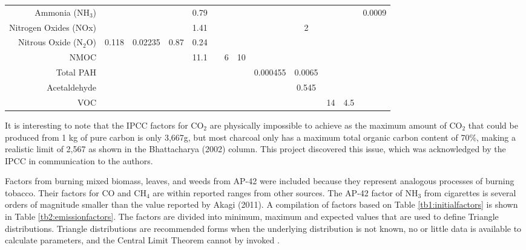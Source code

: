 \begin{sidewaystable}
\begin{table}[H]
{\begin{tabular}{@{}rcccccccccccc@{}}
Ammonia (NH$_{3}$) &  &  &  & 0.79 &  &  &  &  &  &  &  & 0.0009 \\
Nitrogen Oxides (NOx) &  &  &  & 1.41 &  &  &  &  & 2 &  &  &  \\
Nitrous Oxide (N$_{2}$O) & 0.118 & 0.02235 & 0.87 & 0.24 &  &  &  &  &  &  &  &  \\
NMOC &  &  &  & 11.1 &  & 6 & 10 &  &  &  &  &  \\
Total PAH &  &  &  &  &  &  &  & 0.000455 & 0.0065 &  &  &  \\
Acetaldehyde &  &  &  &  &  &  &  &  & 0.545 &  &  &  \\
VOC &  &  &  &  &  &  &  &  &  & 14 & 4.5 &  \\ \bottomrule
\end{tabular}
} %
\end{table}	 
\end{sidewaystable}

It is interesting to note that the IPCC factors for CO$_{2}$ are physically impossible to achieve as the maximum amount of CO$_{2}$ that could be produced from 1 kg of pure carbon is only 3,667g, but most charcoal only has a maximum total organic carbon content of 70\%, making a realistic limit of 2,567 as shown in the Bhattacharya (2002) column.  This project discovered this issue, which was acknowledged by the IPCC in communication to the authors. 

Factors from burning mixed biomass, leaves, and weeds from AP-42 were included because they represent analogous processes of burning tobacco.  Their factors for CO and CH$_{4}$ are within reported ranges from other sources.  The AP-42 factor of NH$_{3}$ from cigarettes is several orders of magnitude smaller than the value reported by Akagi (2011). A compilation of factors based on Table \ref{tb1:initialfactors} is shown in Table \ref{tb2:emissionfactors}. The factors are divided into minimum, maximum and expected values that are used to define Triangle distributions. Triangle distributions are recommended forms when the underlying distribution is not known, no or little data is available to calculate parameters, and the Central Limit Theorem cannot by invoked \citep{Firestone1997, Lipton1995, Salling2008}. 

